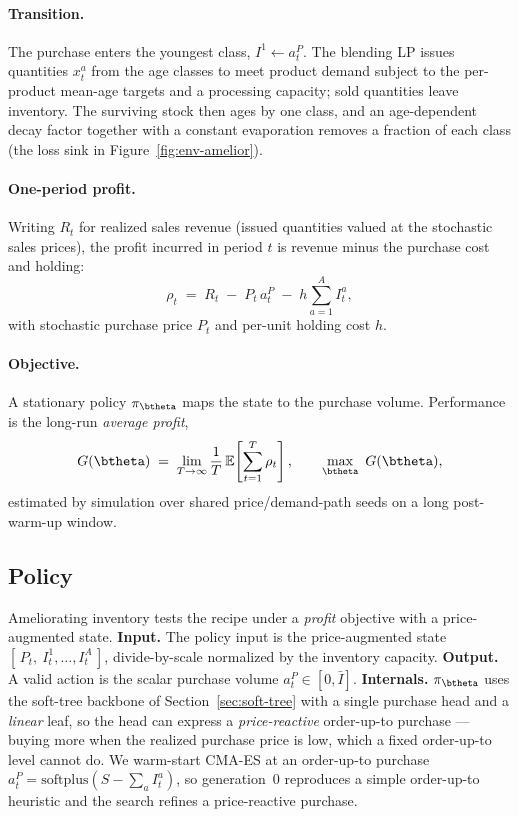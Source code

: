 \paragraph{Transition.}
The purchase enters the youngest class, $I^{1}\!\leftarrow a^P_t$. The blending LP issues quantities
$x^{a}_t$ from the age classes to meet product demand subject to the per-product mean-age targets and a
processing capacity; sold quantities leave inventory. The surviving stock then ages by one class, and
an age-dependent decay factor together with a constant evaporation removes a fraction of each class
(the loss sink in Figure~\ref{fig:env-amelior}).

\paragraph{One-period profit.}
Writing $R_t$ for realized sales revenue (issued quantities valued at the stochastic sales prices),
the profit incurred in period $t$ is revenue minus the purchase cost and holding:
\begin{equation}
    \label{eq:amelior-profit}
    \rho_t \;=\; R_t \;-\; P_t\,a^P_t \;-\; h\sum_{a=1}^{A} I^{a}_t ,
\end{equation}
with stochastic purchase price $P_t$ and per-unit holding cost $h$.

\paragraph{Objective.}
A stationary policy $\pi_{\btheta}$ maps the state to the purchase volume. Performance is the long-run
\emph{average profit},
\begin{equation}
    \label{eq:amelior-objective}
    G(\btheta) \;=\; \lim_{T\to\infty}\frac{1}{T}\,\mathbb{E}\!\left[\sum_{t=1}^{T}\rho_t\right],
    \qquad \max_{\btheta}\ G(\btheta),
\end{equation}
estimated by simulation over shared price/demand-path seeds on a long post-warm-up window.

\FloatBarrier

\subsection{Policy}
\label{sec:amelior-policy}

Ameliorating inventory tests the recipe under a \emph{profit} objective with a price-augmented state.
\textbf{Input.} The policy input is the price-augmented state $[\,P_t,\ I^{1}_t,\dots,I^{A}_t\,]$,
divide-by-scale normalized by the inventory capacity. \textbf{Output.} A valid action is the scalar
purchase volume $a^P_t\in[0,\bar I]$. \textbf{Internals.} $\pi_{\btheta}$ uses the soft-tree backbone
of Section~\ref{sec:soft-tree} with a single purchase head and a \emph{linear} leaf, so the head can
express a \emph{price-reactive} order-up-to purchase --- buying more when the realized purchase price
is low, which a fixed order-up-to level cannot do. We warm-start CMA-ES at an order-up-to purchase
$a^P_t=\mathrm{softplus}\!\left(S-\sum_a I^{a}_t\right)$, so generation~0 reproduces a simple
order-up-to heuristic and the search refines a price-reactive purchase.

